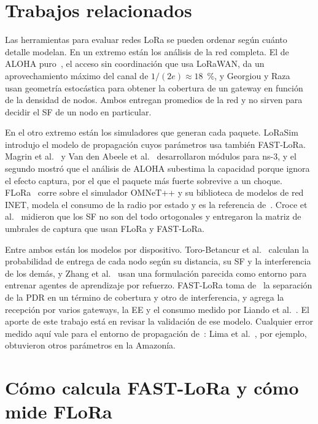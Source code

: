 \documentclass[conference,a4paper]{IEEEtran}
\begin{document}
\section{Trabajos relacionados}

Las herramientas para evaluar redes LoRa se pueden ordenar según cuánto detalle modelan. En un extremo están los análisis de la red completa. El de ALOHA puro~\cite{abramson}, el acceso sin coordinación que usa LoRaWAN, da un aprovechamiento máximo del canal de $1/(2e)\approx18$~\%, y Georgiou y Raza~\cite{georgiou} usan geometría estocástica para obtener la cobertura de un gateway en función de la densidad de nodos. Ambos entregan promedios de la red y no sirven para decidir el SF de un nodo en particular.

En el otro extremo están los simuladores que generan cada paquete. LoRaSim~\cite{bor} introdujo el modelo de propagación cuyos parámetros usa también FAST-LoRa. Magrin et al.~\cite{magrin} y Van den Abeele et al.~\cite{vandenabeele} desarrollaron módulos para ns-3, y el segundo mostró que el análisis de ALOHA subestima la capacidad porque ignora el efecto captura, por el que el paquete más fuerte sobrevive a un choque. FLoRa~\cite{flora} corre sobre el simulador OMNeT++ y su biblioteca de modelos de red INET, modela el consumo de la radio por estado y es la referencia de~\cite{fastlora}. Croce et al.~\cite{croce} midieron que los SF no son del todo ortogonales y entregaron la matriz de umbrales de captura que usan FLoRa y FAST-LoRa.

Entre ambos están los modelos por dispositivo. Toro-Betancur et al.~\cite{toro} calculan la probabilidad de entrega de cada nodo según su distancia, su SF y la interferencia de los demás, y Zhang et al.~\cite{zhang} usan una formulación parecida como entorno para entrenar agentes de aprendizaje por refuerzo. FAST-LoRa toma de~\cite{zhang} la separación de la PDR en un término de cobertura y otro de interferencia, y agrega la recepción por varios gateways, la EE y el consumo medido por Liando et al.~\cite{liando}. El aporte de este trabajo está en revisar la validación de ese modelo. Cualquier error medido aquí vale para el entorno de propagación de~\cite{bor}: Lima et al.~\cite{lima}, por ejemplo, obtuvieron otros parámetros en la Amazonía.

\section{Cómo calcula FAST-LoRa y cómo mide FLoRa}
\label{sec:modelo}
\end{document}
